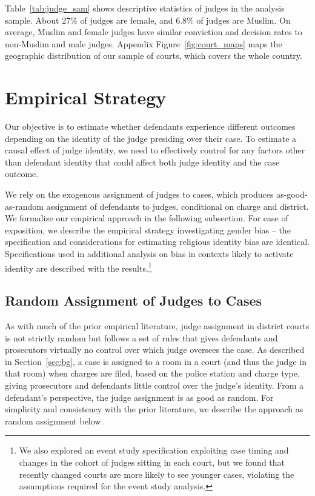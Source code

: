 \documentclass[12pt,english]{article}
\begin{document}
  Table~\ref{tab:judge_sam} shows descriptive statistics of judges in the analysis sample. About 27\% of judges are female, and 6.8\% of judges are Muslim. On average, Muslim and female judges have similar conviction and decision rates to non-Muslim and male judges. Appendix Figure~\ref{fig:court_maps} maps the geographic distribution of our sample of courts, which covers the whole country.
  
\section{Empirical Strategy}
\label{sec:strategy}

Our objective is to estimate whether defendants experience different outcomes depending on the identity of the judge presiding over their case. To estimate a causal effect of judge identity, we need to effectively control for any factors other than defendant identity that could affect both judge identity and the case outcome. 

We rely on the exogenous assignment of judges to cases, which produces as-good-as-random assignment of defendants to judges, conditional on charge and district. We formalize our empirical approach in the following subsection. For ease of exposition, we describe the empirical strategy investigating gender bias -- the specification and considerations for estimating religious identity bias are identical. Specifications used in additional analysis on bias in contexts likely to activate identity are described with the results.\footnote{We also explored an event study specification exploiting case timing and changes in the cohort of judges sitting in each court, but we found that recently changed courts are more likely to see younger cases, violating the assumptions required for the event study analysis.}

\subsection{Random Assignment of Judges to Cases}

As with much of the prior empirical literature, judge assignment in district courts is not strictly random but follows a set of rules that gives defendants and prosecutors virtually no control over which judge oversees the case. As described in Section~\ref{sec:bg}, a case is assigned to a room in a court (and thus the judge in that room) when charges are filed, based on the police station and charge type, giving prosecutors and defendants little control over the judge's identity. From a defendant's perspective, the judge assignment is as good as random. For simplicity and consistency with the prior literature, we describe the approach as random assignment below.
\end{document}
